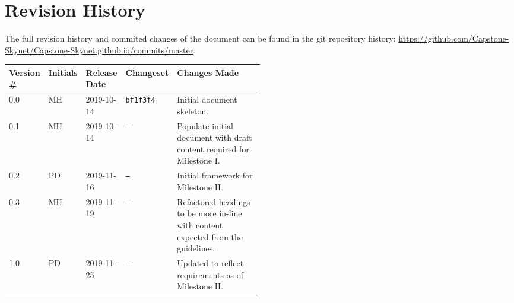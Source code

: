 \thispagestyle{empty}
\section*{Revision History}
The full revision history and commited changes of the document can be found in the git repository history: \href{https://github.com/Capstone-Skynet/Capstone-Skynet.github.io}{https://github.com/Capstone-Skynet/Capstone-Skynet.github.io/commits/master}.

\begin{table}[H]
\begin{tabular}{*{4}{l}p{0.5\linewidth}}
\hline
Version \# & Initials & Release Date & Changeset & Changes Made \\ \hline

0.0 & MH & 2019-10-14 & \texttt{bf1f3f4} & Initial document skeleton.\\
0.1 & MH & 2019-10-14 & \texttt{--} & Populate initial document with draft content required for Milestone I.\\
0.2 & PD & 2019-11-16 & \texttt{--} & Initial framework for Milestone II.\\
0.3 & MH & 2019-11-19 & \texttt{--} & Refactored headings to be more in-line with content expected from the guidelines.\\
1.0 & PD & 2019-11-25 & \texttt{--} & Updated to reflect requirements as of Milestone II.\\


 & & & \\ \hline
\end{tabular}
\end{table}